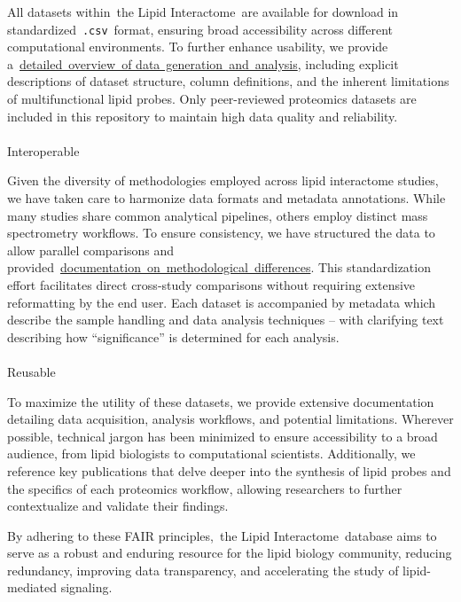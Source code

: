 \documentclass[
  letterpaper,
  DIV=11,
  numbers=noendperiod]{scrartcl}
\makeatletter
\let\oldparagraph\paragraph
\renewcommand{\paragraph}{
    \@ifstar
      \xxxParagraphStar
      \xxxParagraphNoStar
  }
\newcommand{\xxxParagraphStar}[1]{\oldparagraph*{#1}\mbox{}}
\newcommand{\xxxParagraphNoStar}[1]{\oldparagraph{#1}\mbox{}}
\makeatother
\begin{document}
All datasets within~the Lipid Interactome~are available for download in
standardized~\texttt{.csv}~format, ensuring broad accessibility across
different computational environments. To further enhance usability, we
provide
a~\href{https://www.lipidinteractome.org/background/multifunctionallipidprobesoverview}{detailed~overview~of
data~generation~and~analysis}, including explicit descriptions of
dataset structure, column definitions, and the inherent limitations of
multifunctional lipid probes. Only peer-reviewed proteomics datasets are
included in this repository to maintain high data quality and
reliability.

\paragraph{Interoperable}\label{interoperable}

Given the diversity of methodologies employed across lipid interactome
studies, we have taken care to harmonize data formats and metadata
annotations. While many studies share common analytical pipelines,
others employ distinct mass spectrometry workflows. To ensure
consistency, we have structured the data to allow parallel comparisons
and
provided~\href{https://www.lipidinteractome.org/background/proteomicsusingmultifunctionalprobes}{documentation~on~methodological~differences}.
This standardization effort facilitates direct cross-study comparisons
without requiring extensive reformatting by the end user. Each dataset
is accompanied by metadata which describe the sample handling and data
analysis techniques -- with clarifying text describing how
``significance'' is determined for each analysis.

\paragraph{Reusable}\label{reusable}

To maximize the utility of these datasets, we provide extensive
documentation detailing data acquisition, analysis workflows, and
potential limitations. Wherever possible, technical jargon has been
minimized to ensure accessibility to a broad audience, from lipid
biologists to computational scientists. Additionally, we reference key
publications that delve deeper into the synthesis of lipid probes and
the specifics of each proteomics workflow, allowing researchers to
further contextualize and validate their findings.

By adhering to these FAIR principles,~the Lipid Interactome~database
aims to serve as a robust and enduring resource for the lipid biology
community, reducing redundancy, improving data transparency, and
accelerating the study of lipid-mediated signaling.
\end{document}
